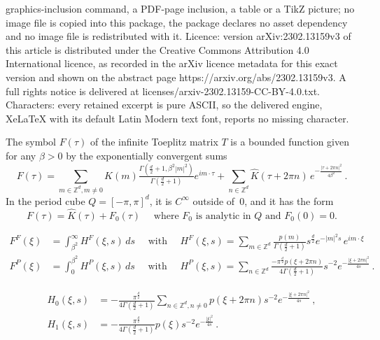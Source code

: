 \documentclass[10pt,a4paper]{amsart}
\let\hat=\widehat
\newcommand\Z{{\mathbb Z}}
\begin{document}
graphics-inclusion command, a PDF-page inclusion, a table or a TikZ picture; no image file is copied into this package, the package declares no asset dependency and no image file is redistributed with it. Licence: version arXiv:2302.13159v3 of this article is distributed under the Creative Commons Attribution 4.0 International licence, as recorded in the arXiv licence metadata for this exact version and shown on the abstract page https://arxiv.org/abs/2302.13159v3. A full rights notice is delivered at licenses/arxiv-2302.13159-CC-BY-4.0.txt. Characters: every retained excerpt is pure ASCII, so the delivered engine, XeLaTeX with its default Latin Modern text font, reports no missing character.
\begin{proposition}
 \label{P:NumSym}
The symbol $F(\tau)$ of the infinite Toeplitz matrix $T$ is a bounded function given for any $\beta>0$ by the exponentially convergent sums
\begin{equation}
\label{E:Fewald}
 F(\tau) = 
 \sum_{m\in\Z^{d},m\ne0}K(m)\tfrac{\Gamma(\tfrac d2+1,\beta^{2}|m|^{2})}{\Gamma(\frac d2+1)}e^{im\cdot \tau} +
 \sum_{n\in\Z^{d}}\hat K(\tau+2\pi n)\,e^{-\frac{|\tau+2\pi n|^{2}}{4\beta^{2}}}\,.
\end{equation}
In the period cube $Q=[-\pi,\pi]^{d}$, it is $C^{\infty}$ outside of $\,0$, and it has the form
\begin{equation}
\label{E:F=F0+Khat} 
 F(\tau) = \hat K(\tau) + F_{0}(\tau) \quad\mbox{ where $F_{0}$ is analytic in $Q$ and $F_{0}(0)=0$}.  
\end{equation}
\end{proposition}

\begin{align}
\label{E:FFintsum}
 F^{F}(\xi) &= \int_{\beta^{2}}^{\infty}\!\!\! H^{F}(\xi,s)\,ds \quad\mbox{ with }\quad
 H^{F}(\xi,s) = \sum_{m\in\Z^{d}} 
    \frac{p(m)}{\Gamma(\frac d2+1)} s^{\frac d2}e^{-|m|^{2}s}
    \,e^{im\cdot \xi}\\
\label{E:FPintsum}
 F^{P}(\xi) &= \int_{0}^{\beta^{2}}\!\!\! H^{P}(\xi,s)\,ds \quad\mbox{ with }\quad
 H^{P}(\xi,s) =
 \sum_{n\in\Z^{d}}
    \frac{-\pi^{\frac d2}p(\xi+2\pi n)}{4\Gamma(\frac d2+1)} s^{-2}e^{-\frac{|\xi+2\pi n|^{2}}{4s}}\,.
\end{align}

\begin{align}
\label{E:H0} 
 H_{0}(\xi,s) &= -\tfrac{\pi^{\frac d2}}{4\Gamma(\frac d2+1)}
 \!\!\!
  \sum_{n\in\Z^{d},n\ne0} \!\!\!
    p(\xi+2\pi n) s^{-2}e^{-\frac{|\xi+2\pi n|^{2}}{4s}}\,,\\
\label{E:H1}
  H_{1}(\xi,s) &= -\tfrac{\pi^{\frac d2}}{4\Gamma(\frac d2+1)}
     p(\xi) s^{-2}e^{-\frac{|\xi|^{2}}{4s}}\,.
\end{align}
\end{document}
